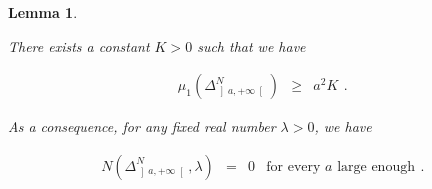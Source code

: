 \documentclass{jams-l}
\newtheorem{lemma}[theorem]{Lemma}
\theoremstyle{definition}
\theoremstyle{remark}
\numberwithin{equation}{section}
\begin{document}
        \begin{lemma}
        \label{LemmaSpectralCountingSchrinkingCusp}
        
            There exists a constant $K > 0$ such that we have 
            
            \[ \begin{array}{lll}
                    \mu_1 \left( \Delta^N_{\left] a, +\infty \right[} \right) & \geqslant & a^2 K
                \end{array} . \]
            
            \noindent As a consequence, for any fixed real number $\lambda > 0$, we have
            
            \[ \begin{array}{llll}
                   N \left( \Delta^N_{\left] a, +\infty \right[}, \lambda \right) & = & 0 & \text{for every $a$ large enough}
                \end{array} . \]
        
        \end{lemma}
        
\end{document}

